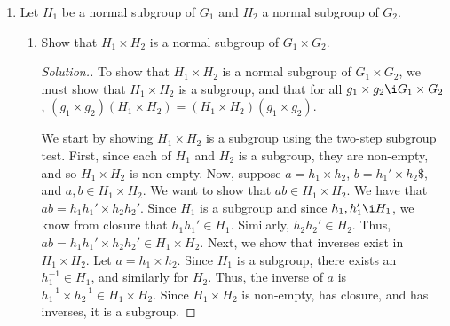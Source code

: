 \documentclass{article}
\newcommand{\sk}{\smallskip}
\begin{document}
\begin{enumerate}
\begin{enumerate}
        \item Give an example of a group $G$ with two subgroups $K_1, K_2$ for which $K_1K_2$ is not a subgroup of G.

        \begin{proof}[Solution.]
            Let $G = S_3$, $K_1 = \{(1), (12)\}$, and $K_2 = \{(1), (13)\}$. Then $K_1K_2 = \{(1), (12), (13), (132)\}$. However, $K_1K_2$ is not a subgroup, since $(13)(132) = (32) \notin K_1K_2$.            
        \end{proof}
    \end{enumerate}


    \item Let $H_1$ be a normal subgroup of $G_1$ and $H_2$ a normal subgroup of $G_2$.
    \begin{enumerate}
        \item Show that $H_1 \times H_2$ is a normal subgroup of $G_1 \times G_2$.

        \begin{proof}[Solution.]
            To show that $H_1 \times H_2$ is a normal subgroup of $G_1 \times G_2$, we must show that $H_1 \times H_2$ is a subgroup, and that for all $g_1 \times g_2 \i G_1 \times G_2$, $(g_1 \times g_2)(H_1 \times H_2) = (H_1 \times H_2)(g_1 \times g_2)$.

            \sk

            We start by showing $H_1 \times H_2$ is a subgroup using the two-step subgroup test. First, since each of $H_1$ and $H_2$ is a subgroup, they are non-empty, and so $H_1 \times H_2$ is non-empty. Now, suppose $a = h_1 \times h_2$, $b = h_1' \times h_2\$$, and $a, b \in H_1 \times H_2$. We want to show that $ab \in H_1 \times H_2$. We have that $ab = h_1h_1' \times h_2h_2'$. Since $H_1$ is a subgroup and since $h_1, h_1' \i H_1$, we know from closure that $h_1h_1' \in H_1$. Similarly, $h_2h_2' \in H_2$. Thus, $ab = h_1h_1' \times h_2h_2' \in H_1 \times H_2$. Next, we show that inverses exist in $H_1 \times H_2$. Let $a = h_1 \times h_2$. Since $H_1$ is a subgroup, there exists an $h_1^{-1} \in H_1$, and similarly for $H_2$. Thus, the inverse of $a$ is $h_1^{-1} \times h_2^{-1} \in H_1 \times H_2$. Since $H_1 \times H_2$ is non-empty, has closure, and has inverses, it is a subgroup. 

            \sk


\end{proof}
\end{enumerate}
\end{enumerate}
\end{document}
